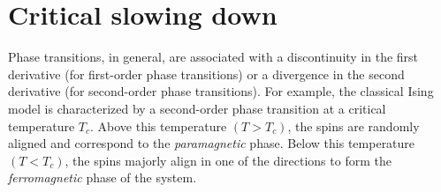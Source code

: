 \documentclass[../journal_main.tex]{subfiles}
\begin{document}
\section{Critical slowing down}
Phase transitions, in general, are associated with a discontinuity in the first derivative (for first-order phase transitions) or a divergence in the second derivative (for second-order phase transitions). For example, the classical Ising model is characterized by a second-order phase transition at a critical temperature $T_c$. Above this temperature $(T>T_c)$, the spins are randomly aligned and correspond to the \textit{paramagnetic} phase. Below this temperature $(T<T_c)$, the spins majorly align in one of the directions to form the \textit{ferromagnetic} phase of the system.~\\~\\
\end{document}
